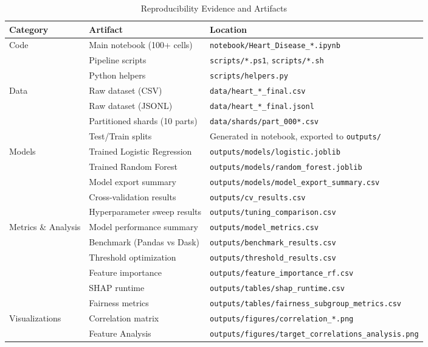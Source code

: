 \documentclass[12pt,a4paper]{article}
\begin{document}
\begin{table}[H]
\centering
\caption{Reproducibility Evidence and Artifacts}
\begin{tabular}{|l|p{8cm}|l|}
\hline
\textbf{Category} & \textbf{Artifact} & \textbf{Location} \\
\hline
\multirow{3}{*}{Code} & Main notebook (100+ cells) & \texttt{notebook/Heart\_Disease\_*.ipynb} \\
& Pipeline scripts & \texttt{scripts/*.ps1}, \texttt{scripts/*.sh} \\
& Python helpers & \texttt{scripts/helpers.py} \\
\hline
\multirow{4}{*}{Data} & Raw dataset (CSV) & \texttt{data/heart\_*\_final.csv} \\
& Raw dataset (JSONL) & \texttt{data/heart\_*\_final.jsonl} \\
& Partitioned shards (10 parts) & \texttt{data/shards/part\_000*.csv} \\
& Test/Train splits & Generated in notebook, exported to \texttt{outputs/} \\
\hline
\multirow{5}{*}{Models} & Trained Logistic Regression & \texttt{outputs/models/logistic.joblib} \\
& Trained Random Forest & \texttt{outputs/models/random\_forest.joblib} \\
& Model export summary & \texttt{outputs/models/model\_export\_summary.csv} \\
& Cross-validation results & \texttt{outputs/cv\_results.csv} \\
& Hyperparameter sweep results & \texttt{outputs/tuning\_comparison.csv} \\
\hline
\multirow{6}{*}{Metrics \& Analysis} & Model performance summary & \texttt{outputs/model\_metrics.csv} \\
& Benchmark (Pandas vs Dask) & \texttt{outputs/benchmark\_results.csv} \\
& Threshold optimization & \texttt{outputs/threshold\_results.csv} \\
& Feature importance & \texttt{outputs/feature\_importance\_rf.csv} \\
& SHAP runtime & \texttt{outputs/tables/shap\_runtime.csv} \\
& Fairness metrics & \texttt{outputs/tables/fairness\_subgroup\_metrics.csv} \\
\hline
\multirow{8}{*}{Visualizations} & Correlation matrix & \texttt{outputs/figures/correlation\_*.png} \\
& Feature Analysis & \texttt{outputs/figures/target\_correlations\_analysis.png} \\

\end{tabular}
\end{table}
\end{document}
